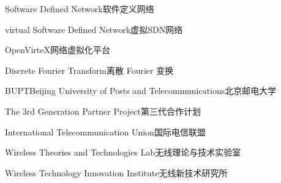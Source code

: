 

{Software Defined Network}{软件定义网络}

{virtual Software Defined Network}{虚拟SDN网络}

{OpenVirteX}{网络虚拟化平台}

{Discrete Fourier Transform}{离散 Fourier 变换}

{BUPT}{Beijing University of Posts and Telecommunications}{北京邮电大学}

{The 3rd Generation Partner Project}{第三代合作计划}

{International Telecommunication Union}{国际电信联盟}

{Wireless Theories and Technologies Lab}{无线理论与技术实验室}

{Wireless Technology Innovation Institute}{无线新技术研究所}
